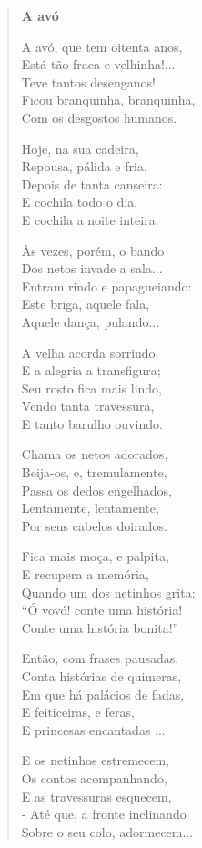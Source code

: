 \begin{verse}
\textbf{A avó}

A avó, que tem oitenta anos,\\
Está tão fraca e velhinha!...\\
Teve tantos desenganos!\\
Ficou branquinha, branquinha,\\
Com os desgostos humanos.\pagebreak


Hoje, na sua cadeira,\\
Repousa, pálida e fria,\\
Depois de tanta canseira:\\
E cochila todo o dia,\\
E cochila a noite inteira.


Às vezes, porém, o bando\\
Dos netos invade a sala...\\
Entram rindo e papagueiando:\\
Este briga, aquele fala,\\
Aquele dança, pulando...


A velha acorda sorrindo.\\
E a alegria a transfigura;\\
Seu rosto fica mais lindo,\\
Vendo tanta travessura,\\
E tanto barulho ouvindo.


Chama os netos adorados,\\
Beija-os, e, tremulamente,\\
Passa os dedos engelhados,\\
Lentamente, lentamente,\\
Por seus cabelos doirados.


Fica mais moça, e palpita,\\
E recupera a memória,\\
Quando um dos netinhos grita:\\
“Ó vovó! conte uma história!\\
Conte uma história bonita!”


Então, com frases pausadas,\\
Conta histórias de quimeras,\\
Em que há palácios de fadas,\\
E feiticeiras, e feras,\\
E princesas encantadas ...

\enlargethispage{2\baselineskip}
E os netinhos estremecem,\\
Os contos acompanhando,\\
E as travessuras esquecem,\\
- Até que, a fronte inclinando\\
Sobre o seu colo, adormecem...
\end{verse}

